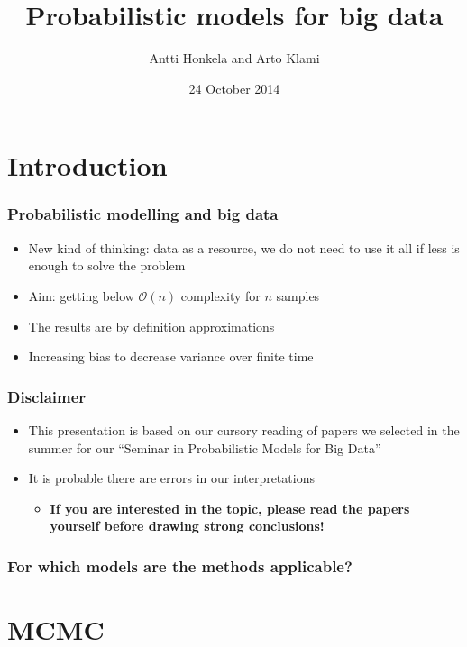 \documentclass{beamer}
\title{Probabilistic models for big data}
\author{Antti Honkela and Arto Klami}
\date{24 October 2014}
\begin{document}
\frame{\titlepage}


\section{Introduction}

\begin{frame}
  \frametitle{Probabilistic modelling and big data}

  \begin{itemize}
  \item New kind of thinking: data as a resource, we do not need to
    use it all if less is enough to solve the problem
  \item Aim: getting below $\mathcal{O}(n)$ complexity for $n$ samples
  \item The results are by definition approximations
  \item Increasing bias to decrease variance over finite time
  \end{itemize}
\end{frame}

\begin{frame}
  \frametitle{Disclaimer}

  \begin{itemize}
  \item This presentation is based on our cursory reading of papers we
    selected in the summer for our ``Seminar in Probabilistic Models
    for Big Data''
  \item It is probable there are errors in our interpretations
    \begin{itemize}
    \item \textbf{If you are interested in the topic, please read the
      papers yourself before drawing strong conclusions!}
    \end{itemize}
  \end{itemize}
\end{frame}

\begin{frame}
  \frametitle{For which models are the methods applicable?}
\end{frame}

\section{MCMC}

\end{document}
